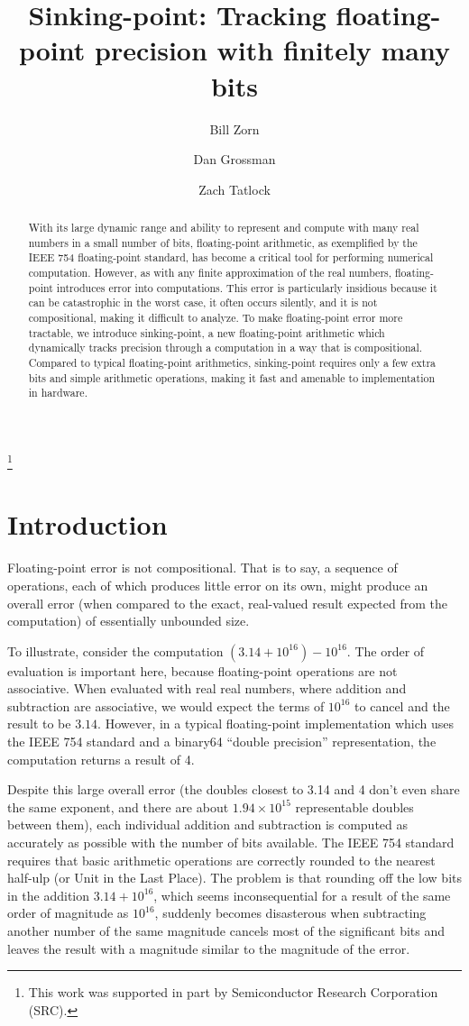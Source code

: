 \documentclass[letterpaper,10pt]{article}
\title{Sinking-point: Tracking floating-point precision with finitely many bits}
\author{Bill Zorn}
\author{Dan Grossman}
\author{Zach Tatlock}
\affil{University of Washington}
\newcommand\blfootnote[1]{%
  \begingroup
  \renewcommand\thefootnote{}\footnote{#1}%
  \addtocounter{footnote}{-1}%
  \endgroup
}
\begin{document}
\maketitle

\blfootnote{This work was supported in part by Semiconductor Research Corporation (SRC).}

\begin{abstract}
 With its large dynamic range and ability to represent and compute with many real numbers in a small number of bits, floating-point arithmetic, as exemplified by the IEEE 754 floating-point standard, has become a critical tool for performing numerical computation. However, as with any finite approximation of the real numbers, floating-point introduces error into computations. This error is particularly insidious because it can be catastrophic in the worst case, it often occurs silently, and it is not compositional, making it difficult to analyze. To make floating-point error more tractable, we introduce sinking-point, a new floating-point arithmetic which dynamically tracks precision through a computation in a way that is compositional. Compared to typical floating-point arithmetics, sinking-point requires only a few extra bits and simple arithmetic operations, making it fast and amenable to implementation in hardware.
\end{abstract}


\section{Introduction}

Floating-point error is not compositional. That is to say, a sequence of operations, each of which produces little error on its own, might produce an overall error (when compared to the exact, real-valued result expected from the computation) of essentially unbounded size.

To illustrate, consider the computation $(3.14 + 10^{16}) - 10^{16}$. The order of evaluation is important here, because floating-point operations are not associative. When evaluated with real real numbers, where addition and subtraction are associative, we would expect the terms of $10^{16}$ to cancel and the result to be $3.14$. However, in a typical floating-point implementation which uses the IEEE 754 standard and a binary64 ``double precision'' representation, the computation returns a result of 4.

Despite this large overall error (the doubles closest to 3.14 and 4 don't even share the same exponent, and there are about $1.94 \times 10^{15}$ representable doubles between them), each individual addition and subtraction is computed as accurately as possible with the number of bits available. The IEEE 754 standard requires that basic arithmetic operations are correctly rounded to the nearest half-ulp (or Unit in the Last Place). The problem is that rounding off the low bits in the addition $3.14 + 10^{16}$, which seems inconsequential for a result of the same order of magnitude as $10^{16}$, suddenly becomes disasterous when subtracting another number of the same magnitude cancels most of the significant bits and leaves the result with a magnitude similar to the magnitude of the error.
\end{document}
